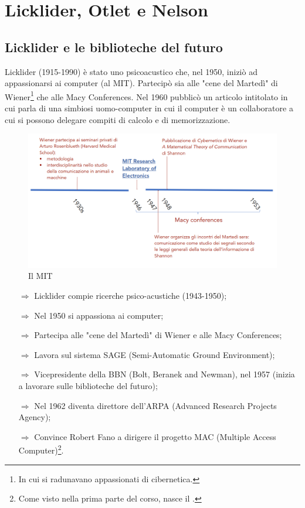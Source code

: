\chapter{Licklider, Otlet e Nelson}

\section{Licklider e le biblioteche del futuro}

Licklider (1915-1990) è stato uno psicoacustico che, nel 1950, iniziò ad appassionarsi
ai computer (al MIT). Partecipò sia alle "cene del Martedì" di Wiener\footnote{In cui si radunavano appassionati di cibernetica.} che 
alle Macy Conferences. Nel 1960 pubblicò un articolo intitolato  in cui
parla di una simbiosi uomo-computer in cui il computer è un collaboratore a cui si possono delegare
compiti di calcolo e di memorizzazione. 

\begin{figure}[h]
    \centering
    \includegraphics[scale=0.25]{images/MIT.png}
    \caption{Il MIT}
\end{figure}

\begin{itemize}
    \item [$\Rightarrow$] Licklider compie ricerche psico-acustiche (1943-1950);
    \item [$\Rightarrow$] Nel 1950 si appassiona ai computer;
    \item [$\Rightarrow$] Partecipa alle "cene del Martedì" di Wiener e alle Macy Conferences;
    \item [$\Rightarrow$] Lavora sul sistema SAGE (Semi-Automatic Ground Environment);
    \item [$\Rightarrow$] Vicepresidente della BBN (Bolt, Beranek and Newman), nel 1957 (inizia a lavorare sulle biblioteche del futuro);
    \item [$\Rightarrow$] Nel 1962 diventa direttore dell'ARPA (Advanced Research Projects Agency);
    \item [$\Rightarrow$] Convince Robert Fano a dirigere il progetto MAC (Multiple Access Computer)\footnote{Come visto nella prima parte del corso, nasce il .}.
\end{itemize}

